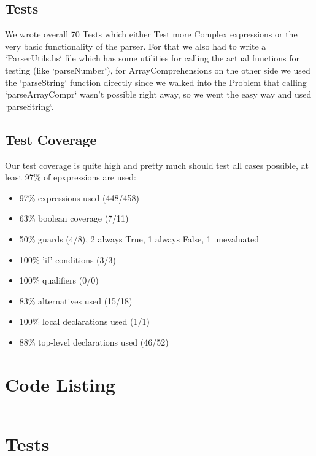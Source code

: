 \documentclass[12pt,a4paper]{article}
\begin{document}
\subsection{Tests}

We wrote overall 70 Tests which either Test more Complex expressions or the very basic functionality of the parser.
For that we also had to write a `ParserUtils.hs` file which has some utilities for calling the actual functions for testing (like `parseNumber`), for ArrayComprehensions on the other side we used the `parseString` function directly since we walked into the Problem that calling `parseArrayCompr` wasn't possible right away, so we went the easy way and used `parseString`.

\subsection{Test Coverage}
Our test coverage is quite high and pretty much should test all cases possible, at least 97\% of epxpressions are used:
\begin{itemize}
	\item  97\% expressions used (448/458)
 	\item 63\% boolean coverage (7/11)
     \item 50\% guards (4/8), 2 always True, 1 always False, 1 unevaluated
     \item 100\% 'if' conditions (3/3)
     \item 100\% qualifiers (0/0)
 	 \item 83\% alternatives used (15/18)
	 \item 100\% local declarations used (1/1)
 	 \item 88\% top-level declarations used (46/52)
\end{itemize}


\appendix
\section{Code Listing}

\inputminted{haskell}{handin/src/Parser/Impl.hs}

\section{Tests}

\inputminted{haskell}{handin/tests/Test.hs}

\inputminted{haskell}{handin/tests/ParserUtils.hs}
\end{document}
